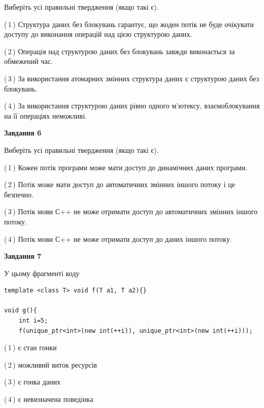 \documentclass[12pt, ukrainian]{article}
\begin{document}
\begin {large}
{Виберіть усі правильні твердження (якщо такі є).\par
\vspace{2mm}

(\,1\,) Структура даних без блокувань гарантує, що жоден потік не буде очікувати доступу до виконання операцій над цією структурою даних.%

(\,2\,) Операція над структурою даних без блокувань завжди виконається за обмежений час.%

(\,3\,) За використання атомарних змінних структура даних є структурою даних без блокувань.%

(\,4\,) За використання структурою даних рівно одного м’ютексу, взаємоблокування на її операціях неможливі.%
\newpage


\begin{center}
\textbf{Завдання 6}
\end{center}

Виберіть усі правильні твердження (якщо такі є).\par
\vspace{2mm}

(\,1\,) Кожен потік програми може мати доступ до динамічних даних програми.%

(\,2\,) Потік може мати доступ до автоматичних змінних іншого потоку і це безпечно.%

(\,3\,) Потік мови С++ не може отримати доступ до автоматичних змінних іншого потоку.%

(\,4\,) Потік мови С++ не може отримати доступ до даних іншого потоку.%


\begin{center}
\textbf{Завдання 7}
\end{center}

У цьому фрагменті коду
\begin{verbatim}
template <class T> void f(T a1, T a2){}

void g(){
    int i=5;
    f(unique_ptr<int>(new int(++i)), unique_ptr<int>(new int(++i)));
\end{verbatim}

(\,1\,) є стан гонки%

(\,2\,) можливий виток ресурсів%

(\,3\,) є гонка даних%

(\,4\,) є невизначена поведінка%

}
\end {large}

\vspace{4mm}
\newpage
\end{document}
